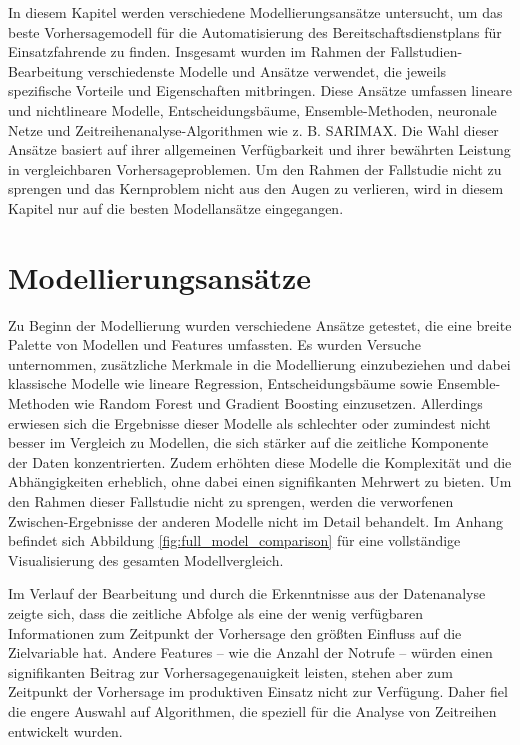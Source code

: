 \documentclass[%
pdftex,
oneside,			%
11pt,				%
parskip=half,		%
headheight = 12pt,	%
headsepline,		%
footsepline,		%
footheight = 16pt,	%
abstracton,		%
DIV=calc,		%
BCOR=8mm,		%
headinclude=false,	%
footinclude=false,	%
listof=totoc,		%
toc=bibliography,	%
]{scrreprt}	%
\begin{document}
    In diesem Kapitel werden verschiedene Modellierungsansätze untersucht, um das beste Vorhersagemodell für die Automatisierung des Bereitschaftsdienstplans für Einsatzfahrende zu finden. 
    Insgesamt wurden im Rahmen der Fallstudien-Bearbeitung verschiedenste Modelle und Ansätze verwendet, die jeweils spezifische Vorteile und Eigenschaften mitbringen. 
    Diese Ansätze umfassen lineare und nichtlineare Modelle, Entscheidungsbäume, Ensemble-Methoden, neuronale Netze und Zeitreihenanalyse-Algorithmen wie z. B. SARIMAX. 
    Die Wahl dieser Ansätze basiert auf ihrer allgemeinen Verfügbarkeit und ihrer bewährten Leistung in vergleichbaren Vorhersageproblemen.
    Um den Rahmen der Fallstudie nicht zu sprengen und das Kernproblem nicht aus den Augen zu verlieren, wird in diesem Kapitel nur auf die besten Modellansätze eingegangen.

    \section{Modellierungsansätze}

        Zu Beginn der Modellierung wurden verschiedene Ansätze getestet, die eine breite Palette von Modellen und Features umfassten. 
        Es wurden Versuche unternommen, zusätzliche Merkmale in die Modellierung einzubeziehen und dabei klassische Modelle wie lineare Regression, Entscheidungsbäume sowie Ensemble-Methoden wie Random Forest und Gradient Boosting einzusetzen.
        Allerdings erwiesen sich die Ergebnisse dieser Modelle als schlechter oder zumindest nicht besser im Vergleich zu Modellen, die sich stärker auf die zeitliche Komponente der Daten konzentrierten. 
        Zudem erhöhten diese Modelle die Komplexität und die Abhängigkeiten erheblich, ohne dabei einen signifikanten Mehrwert zu bieten. 
        Um den Rahmen dieser Fallstudie nicht zu sprengen, werden die verworfenen Zwischen-Ergebnisse der anderen Modelle nicht im Detail behandelt.
        Im Anhang befindet sich Abbildung \ref{fig:full_model_comparison} für eine vollständige Visualisierung des gesamten Modellvergleich.
        
        Im Verlauf der Bearbeitung und durch die Erkenntnisse aus der Datenanalyse zeigte sich, dass die zeitliche Abfolge als eine der wenig verfügbaren Informationen zum Zeitpunkt der Vorhersage den größten Einfluss auf die Zielvariable hat. 
        Andere Features -- wie die Anzahl der Notrufe -- würden einen signifikanten Beitrag zur Vorhersagegenauigkeit leisten, stehen aber zum Zeitpunkt der Vorhersage im produktiven Einsatz nicht zur Verfügung.
        Daher fiel die engere Auswahl auf Algorithmen, die speziell für die Analyse von Zeitreihen entwickelt wurden.
        
\end{document}
